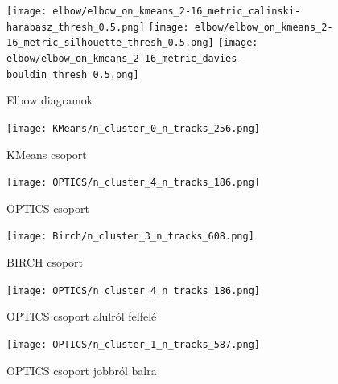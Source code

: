 \documentclass[12pt,a4paper]{article}
\begin{document}
\begin{figure}[htbp]
    \centering
    \texttt{[image: elbow/elbow\_on\_kmeans\_2-16\_metric\_calinski-harabasz\_thresh\_0.5.png]}
    \centering
    \texttt{[image: elbow/elbow\_on\_kmeans\_2-16\_metric\_silhouette\_thresh\_0.5.png]}
    \centering
    \texttt{[image: elbow/elbow\_on\_kmeans\_2-16\_metric\_davies-bouldin\_thresh\_0.5.png]}

    \caption{Elbow diagramok}
    \label{fig: Elbow diagramok}
\end{figure}

\begin{figure}[htbp]
    \begin{minipage}{.5\textwidth}
        \centering
        \texttt{[image: KMeans/n\_cluster\_0\_n\_tracks\_256.png]}
        \caption{KMeans csoport}
        \label{fig:kmeans_cluster}
    \end{minipage}%
    \begin{minipage}{.5\textwidth}
        \centering
        \texttt{[image: OPTICS/n\_cluster\_4\_n\_tracks\_186.png]}
        \caption{OPTICS csoport}
        \label{fig:optics_cluster}
    \end{minipage}
\end{figure}

\begin{figure}[htpb]
    \begin{minipage}{.5\textwidth}
        \centering
        \texttt{[image: Birch/n\_cluster\_3\_n\_tracks\_608.png]}
        \caption{BIRCH csoport}
        \label{fig:birch_cluster}
    \end{minipage}%
    \begin{minipage}{.5\textwidth}
        \centering
        \texttt{[image: OPTICS/n\_cluster\_4\_n\_tracks\_186.png]}
        \caption{OPTICS csoport alulról felfelé}
        \label{fig:optics_cluster_2}
        \texttt{[image: OPTICS/n\_cluster\_1\_n\_tracks\_587.png]}
        \caption{OPTICS csoport jobbról balra}
        \label{fig:optics_cluster_3}
    \end{minipage}
\end{figure}


\end{document}
